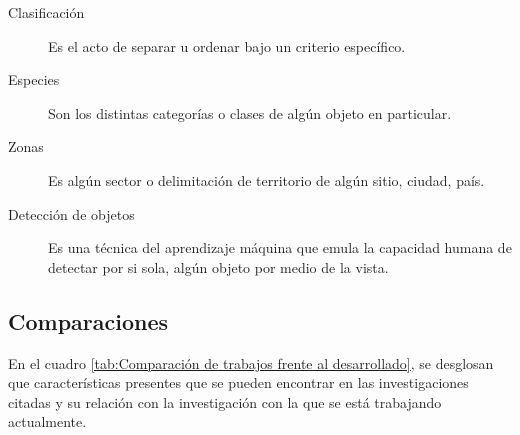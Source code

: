 \begin{description}
\item[Clasificación]{Es el acto de separar u ordenar bajo un criterio específico.}
\end{description}

\begin{description}
\item[Especies]{Son los distintas categorías o  clases de algún objeto en particular.}
\end{description}

\begin{description}
\item[Zonas]{Es algún sector o delimitación de territorio de algún sitio, ciudad, país.}
\end{description}

\begin{description}
\item[Detección de objetos]{Es una técnica del aprendizaje máquina que emula la capacidad humana de detectar por si sola, algún objeto por medio de la vista.}
\end{description}

\clearpage

\subsection{Comparaciones}
En el cuadro \ref{tab:Comparación de trabajos frente al desarrollado}, se desglosan que características presentes  que se pueden encontrar en las investigaciones citadas y su relación con la investigación con la que se está trabajando actualmente.\\
\renewcommand{\tablename}{Cuadro}

